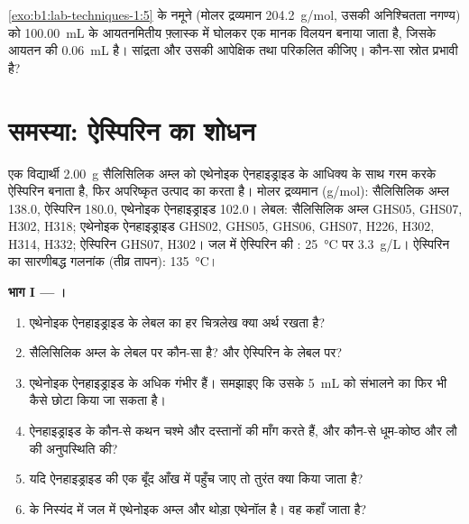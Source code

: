 \begin{exercise}[$\star\star\star$]\label{exo:b1:lab-techniques-1:12}
\cref{exo:b1:lab-techniques-1:5} के नमूने (मोलर द्रव्यमान \qty{204.2}{g/mol}, उसकी
अनिश्चितता नगण्य) को \qty{100.00}{mL} के आयतनमितीय फ़्लास्क में घोलकर एक मानक विलयन
बनाया जाता है, जिसके आयतन की  \qty{0.06}{mL} है।
सांद्रता और उसकी आपेक्षिक तथा  परिकलित कीजिए। कौन-सा
स्रोत प्रभावी है?
\end{exercise}

\section{समस्या: ऐस्पिरिन का शोधन}

\begin{problem}
\label{pb:b1:lab-techniques-1:1}
एक विद्यार्थी \qty{2.00}{g} सैलिसिलिक अम्ल को एथेनोइक ऐनहाइड्राइड के
आधिक्य के साथ गरम करके ऐस्पिरिन बनाता है, फिर अपरिष्कृत उत्पाद का  करता है।
मोलर द्रव्यमान (\unit{g/mol}): सैलिसिलिक अम्ल  138.0, ऐस्पिरिन
 180.0, एथेनोइक ऐनहाइड्राइड  102.0। लेबल:
सैलिसिलिक अम्ल GHS05, GHS07, H302, H318; एथेनोइक ऐनहाइड्राइड GHS02,
GHS05, GHS06, GHS07, H226, H302, H314, H332; ऐस्पिरिन GHS07, H302।
जल में ऐस्पिरिन की : \qty{25}{\celsius} पर \qty{3.3}{g/L}।
ऐस्पिरिन का सारणीबद्ध गलनांक (तीव्र तापन): \qty{135}{\celsius}।

\medskip
\noindent\textbf{भाग I --- ।}
\begin{enumerate}
  \item एथेनोइक ऐनहाइड्राइड के लेबल का हर चित्रलेख क्या अर्थ रखता है?
  \item सैलिसिलिक अम्ल के लेबल पर कौन-सा  है? और
        ऐस्पिरिन के लेबल पर?
  \item एथेनोइक ऐनहाइड्राइड के  अधिक गंभीर हैं। समझाइए कि
        उसके \qty{5}{mL} को संभालने का  फिर भी कैसे छोटा किया जा सकता है।
  \item ऐनहाइड्राइड के कौन-से कथन चश्मे और दस्तानों की माँग करते हैं,
        और कौन-से धूम-कोष्ठ और लौ की अनुपस्थिति की?
  \item यदि ऐनहाइड्राइड की एक बूँद आँख में पहुँच जाए तो तुरंत क्या किया जाता है?
  \item {} के निस्यंद में जल में एथेनोइक अम्ल और थोड़ा
        एथेनॉल है। वह कहाँ जाता है?
\end{enumerate}


\end{problem}
